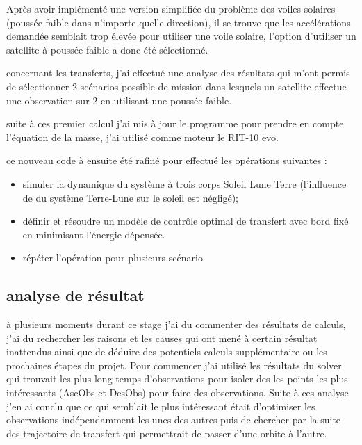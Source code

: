 \documentclass{article} %
\begin{document}
		Après avoir implémenté une version simplifiée du problème des voiles solaires (poussée faible dans n'importe quelle direction), il se trouve que les accélérations demandée semblait trop élevée pour utiliser une voile solaire, l'option d'utiliser un satellite à poussée faible a donc été sélectionné.
		
		concernant les transferts, j'ai effectué une analyse des résultats qui m'ont permis de sélectionner 2 scénarios possible de mission dans lesquels un satellite effectue une observation sur 2 en utilisant une poussée faible.
		
		suite à ces premier calcul j'ai mis à jour le programme pour prendre en compte l'équation de la masse, j'ai utilisé comme moteur le RIT-10 evo.
		
		ce nouveau code à ensuite été rafiné pour effectué les opérations suivantes : 
		
		\begin{itemize}
			\item simuler la dynamique du système à trois corps Soleil Lune Terre (l'influence de du système Terre-Lune sur le soleil est négligé);
			\item définir et résoudre un modèle de contrôle optimal de transfert avec bord fixé en minimisant l'énergie dépensée.
			\item répéter l'opération pour plusieurs scénario 
		\end{itemize}
		
		\subsection{analyse de résultat}
		
		à plusieurs moments durant ce stage j'ai du commenter des résultats de calculs, j'ai du rechercher les raisons et les causes qui ont mené à certain résultat inattendus ainsi que de déduire des potentiels calculs supplémentaire ou les prochaines étapes du projet. Pour commencer j'ai utilisé les résultats du solver qui trouvait les plus long temps d'observations pour isoler des les points les plus intéressants  (\gls{AscObs} et \gls{DesObs}) pour faire des observations. Suite à ces analyse j'en ai conclu que ce qui semblait le plus intéressant était d'optimiser les observations indépendamment les unes des autres puis de chercher par la suite des trajectoire de transfert qui permettrait de passer d'une orbite à l'autre.
		
\end{document}
